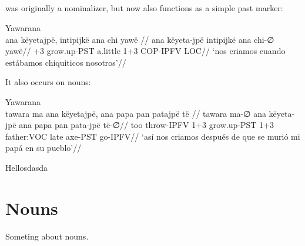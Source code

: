 \documentclass{article}
\begin{document}
\subsection{}

 was originally a nominalizer, but now also functions as a
simple past marker:

 Yawarana \\
\begingl
\glpreamble ana këyetajpë, intipijkë ana chi yawë //
\gla ana këyeta-jpë intipijkë ana chi-∅ yawë//
+3 grow.up-PST a.little 1+3 COP-IPFV LOC//
\glft ‘nos criamos cuando estábamos chiquiticos nosotros’//  
\endgl 
\xe

It also occurs on nouns:

 Yawarana \\
\begingl
\glpreamble tawara ma ana këyetajpë, ana papa pan patajpë të //
\gla tawara ma-∅ ana këyeta-jpë ana papa pan pata-jpë të-∅//
\glb too throw-IPFV 1+3 grow.up-PST 1+3 father:VOC late axe-PST go-IPFV//
\glft ‘así nos criamos después de que se murió mi papá en su pueblo’//  
\endgl 
\xe

Hellosdasda

\section{Nouns}

Someting about nouns.

\printbibliography

% 
% 
% 
% 
% 
% 
% 
% 
% 
\end{document}
